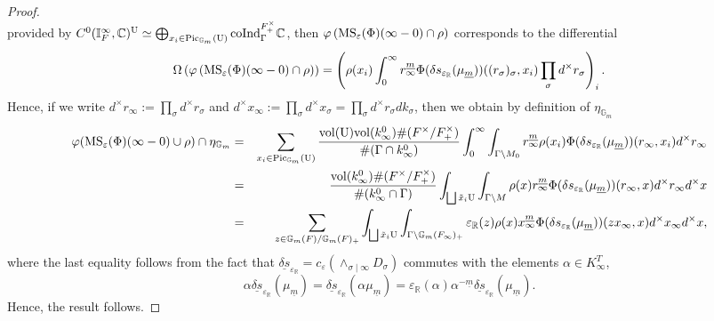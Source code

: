 \documentclass{amsart}
\theoremstyle{definition}
\theoremstyle{remark}
\numberwithin{equation}{section}
\newcommand{\Pic}{\mathrm{Pic}}
\newcommand{\C}{{\mathbb C}}
\newcommand{\R}{{\mathbb R}}
\newcommand{\G}{{\mathbb G}}
\newcommand{\I}{{\mathbb I}}
\begin{document}
\begin{proof}
\[\]
provided by $C^0(\I_F^\infty,\C)^{\rm U}\simeq\bigoplus_{x_i \in \Pic_{\G_m}({\rm U})}{\rm coInd}_{\Gamma}^{F^\times_+}\C$, then $\varphi\left({\rm MS}_\varepsilon(\Phi)(\infty-0)\cap \rho\right)$ corresponds to the differential
\[
\Omega\left(\varphi\left({\rm MS}_\varepsilon(\Phi)(\infty-0)\cap \rho\right)\right)=\left(\rho(x_i)\int_0^\infty r_\infty^{\underline m}\Phi({\delta s}_{\varepsilon_\R}(\mu_{\underline m}))((r_\sigma)_\sigma,x_i)\prod_\sigma d^\times r_\sigma\right)_{i}.
\] 
Hence, if we write $d^\times r_\infty:=\prod_\sigma d^\times r_\sigma$ and $d^\times x_\infty:=\prod_\sigma d^\times x_\sigma=\prod_\sigma d^\times r_\sigma dk_\sigma$, then we obtain by definition of $\eta_{\G_m}$ 
\begin{eqnarray*}
    \varphi({\rm MS}_\varepsilon(\Phi)(\infty-0)\cup\rho)\cap \eta_{\G_m}&=&\sum_{x_i\in\Pic_{\G_m}(\rm U)}\frac{{\rm vol}({\rm U}){\rm vol}(k_\infty^0)\#( F^\times/F^\times_+)}{\#(\Gamma\cap k_\infty^0)}\int_0^\infty \int_{\Gamma\backslash M_0}r_\infty^{\underline m}\rho(x_i)\Phi({\delta s}_{\varepsilon_\R}(\mu_{\underline m}))(r_\infty,x_i) d^\times r_\infty\\
    &=&\frac{{\rm vol}(k_\infty^0)\#( F^\times/F^\times_+)}{\#(k_\infty^0\cap\Gamma)}\int_{\bigsqcup{\tilde x_i}{\rm U}}\int_{\Gamma\backslash M}\rho(x)r_\infty^{\underline m}\Phi({\delta s}_{\varepsilon_\R}(\mu_{\underline m}))(r_\infty,x) d^\times r_\infty d^\times x\\
    &=&\sum_{z\in \G_m(F)/\G_m(F)_+}\int_{\bigsqcup{\tilde x_i}{\rm U}}\int_{\Gamma\backslash \G_m(F_\infty)_+}\varepsilon_\R(z)\rho(x)x_\infty^{\underline m}\Phi({\delta s}_{\varepsilon_\R}(\mu_{\underline m}))(zx_\infty,x) d^\times x_\infty d^\times x,
\end{eqnarray*}
where the last equality follows from the fact that $\underline{\delta s}_{\varepsilon_\R}=c_\varepsilon\left(\wedge_{\sigma\mid\infty} D_\sigma\right)$ commutes with the elements $\alpha\in K^T_\infty$, %
\begin{equation}\label{actTdeltas}
    \alpha \underline{\delta s}_{\varepsilon_\R}(\mu_{\underline m})=\underline{\delta s}_{\varepsilon_\R}(\alpha\mu_{\underline m})=%
\varepsilon_\R(\alpha)\alpha^{-\underline m}\underline{\delta s}_{\varepsilon_\R}(\mu_{\underline m}).
\end{equation}
Hence, the result follows.
\end{proof}
\end{document}
